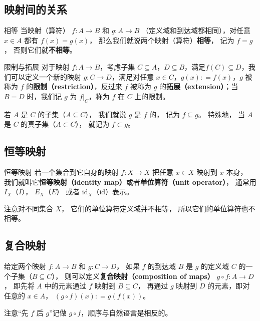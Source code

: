 \subsection{映射间的关系}
\begin{definition}{相等}
当映射（算符） $f: A\to B$ 和 $g: A \to B$ （定义域和到达域都相同），对任意 $x \in A$ 都有 $f(x) = g(x)$， 那么我们就说两个映射（算符）\textbf{相等}， 记为 $f = g$， 否则它们就\textbf{不相等}。
\end{definition}

\begin{definition}{限制与拓展}\label{def_map_3}
对于映射 $f: A \to B$，考虑子集 $C \subseteq A$，$D \subseteq B$，满足$f(C) \subseteq D$，我们可以定义一个新的映射 $g: C \to D$，满足对任意 $x \in C$，$g(x): = f(x)$，$g$ 被称为 $f$ 的\textbf{限制（restriction）}，反过来 $f$ 被称为 $g$ 的\textbf{拓展（extension）}；当 $B = D$ 时，我们记 $g$ 为 $f|_C$，称为 $f$ 在 $C$ 上的限制。

若 $A$ 是 $C$ 的子集（$A\subseteq C$）， 我们就说 $g$ 是 $f$ 的， 记为 $f \subseteq g$。 特殊地， 当 $A$ 是 $C$ 的真子集（$A\subset C$）， 就记为 $f \subset g$。
\end{definition}

\subsection{恒等映射}

\begin{definition}{恒等映射}
若一个集合到它自身的映射 $f: X\to X$ 把任意 $x\in X$ 映射到 $x$ 本身， 我们就叫它\textbf{恒等映射（identity map）}或者\textbf{单位算符（unit operator）}， 通常用 $I_X$（$I$）， $E_X$（$E$） 或者 $\text{id}_X$（$\text{id}$）表示。
\end{definition}
注意对不同集合 $X$， 它们的单位算符定义域并不相等， 所以它们的单位算符也不相等。

\subsection{复合映射}\label{sub_map_2}
\begin{definition}{}\label{def_map_4}
给定两个映射 $f: A \to B$ 和 $g: C \to D$， 如果 $f$ 的到达域 $B$ 是 $g$ 的定义域 $C$ 的一个子集（$B \subseteq C$）， 则可以定义\textbf{复合映射（composition of maps）} $g\circ f: A\to D$， 即先将 $A$ 中的元素通过 $f$ 映射到 $B \subseteq C$， 再通过 $g$ 映射到 $D$ 的元素，即对任意的 $x \in A$， $(g \circ f)(x): = g(f(x))$。
\end{definition}
注意“先 $f$ 后 $g$”记做 $g \circ f$，顺序与自然语言是相反的。

